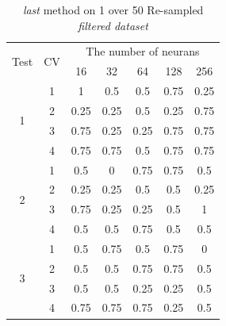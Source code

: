 \documentclass[draft,dvipsnames]{drexel-thesis}
\begin{document}
\begin{thesis}
\begin{table}[!t]
\centering
\caption{{\em last} method on 1 over 50 Re-sampled {\em filtered dataset}}
\label{tbl:last_1_50}
\begin{tabular}{|c|c|c|c|c|c|c|}
\hline
\multirow{2}{*}{Test} & \multirow{2}{*}{CV} & \multicolumn{5}{c|}{The number of neurans}                              \\ \cline{3-7} 
                      &                     & 16           & 32           & 64           & 128         & 256          \\ \hline
\multirow{4}{*}{1}    & 1                   & 1            & 0.5          & 0.5          & 0.75        & 0.25         \\ \cline{2-7} 
                      & 2                   & 0.25         & 0.25         & 0.5          & 0.25        & 0.75         \\ \cline{2-7} 
                      & 3                   & 0.75         & 0.25         & 0.25         & 0.75        & 0.75         \\ \cline{2-7} 
                      & 4                   & 0.75         & 0.75         & 0.5          & 0.75        & 0.75         \\ \hline
\multirow{4}{*}{2}    & 1                   & 0.5          & 0            & 0.75         & 0.75        & 0.5          \\ \cline{2-7} 
                      & 2                   & 0.25         & 0.25         & 0.5          & 0.5         & 0.25         \\ \cline{2-7} 
                      & 3                   & 0.75         & 0.25         & 0.25         & 0.5         & 1            \\ \cline{2-7} 
                      & 4                   & 0.5          & 0.5          & 0.75         & 0.5         & 0.5          \\ \hline
\multirow{4}{*}{3}    & 1                   & 0.5          & 0.75         & 0.5          & 0.75        & 0            \\ \cline{2-7} 
                      & 2                   & 0.5          & 0.5          & 0.75         & 0.75        & 0.5          \\ \cline{2-7} 
                      & 3                   & 0.5          & 0.5          & 0.25         & 0.25        & 0.5          \\ \cline{2-7} 
                      & 4                   & 0.75         & 0.75         & 0.75         & 0.25        & 0.5          \\ \hline

\end{tabular}
\end{table}
\end{thesis}
\end{document}

